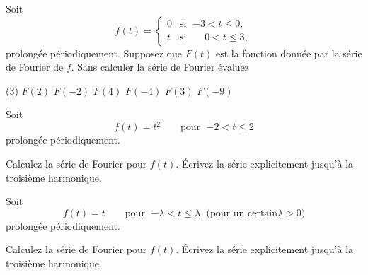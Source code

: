 \begin{exercise}
Soit
\begin{equation*}
f(t) =
\begin{cases}
0 & \text{si } \; {-3} < t \leq 0, \\
t & \text{si } \; \phantom{-}0 < t \leq 3,
\end{cases}
\end{equation*}
prolongée périodiquement.  Supposez que $F(t)$ est la fonction donnée
par la série de Fourier de $f$.  Sans calculer la série de Fourier
évaluez
\begin{tasks}(3)
\task $F(2)$
\task $F(-2)$
\task $F(4)$
\task $F(-4)$
\task $F(3)$
\task $F(-9)$
\end{tasks}
\end{exercise}

\setcounter{exercise}{100}

\begin{exercise}
Soit
\begin{equation*}
f(t) = t^2 \qquad \text{pour } \; {-2} < t \leq 2
\end{equation*}
prolongée périodiquement.
\begin{tasks}
\task Calculez la série de Fourier pour $f(t)$.
\task Écrivez la série explicitement jusqu'à la troisième harmonique.
\end{tasks}
\end{exercise}

\begin{exercise}
Soit
\begin{equation*}
f(t) = t \qquad \text{pour } \; {-\lambda} < t \leq \lambda \; \text{ (pour un certain} \lambda > 0 \text{)}
\end{equation*}
prolongée périodiquement.
\begin{tasks}
\task Calculez la série de Fourier pour $f(t)$.
\task Écrivez la série explicitement jusqu'à la troisième harmonique.
\end{tasks}
\end{exercise}

